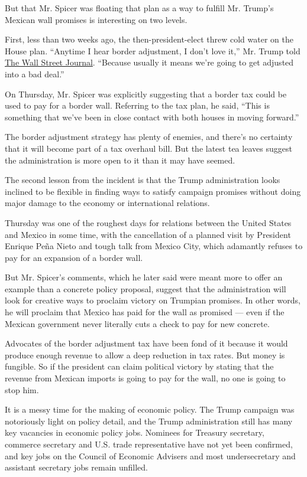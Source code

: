 But that Mr. Spicer was floating that plan as a way to fulfill Mr.
Trump's Mexican wall promises is interesting on two levels.

First, less than two weeks ago, the then-president-elect threw cold
water on the House plan. ``Anytime I hear border adjustment, I don't
love it,'' Mr. Trump told
\href{http://www.wsj.com/articles/trump-warns-on-house-republican-tax-plan-1484613766}{The
Wall Street Journal}. ``Because usually it means we're going to get
adjusted into a bad deal.''

On Thursday, Mr. Spicer was explicitly suggesting that a border tax
could be used to pay for a border wall. Referring to the tax plan, he
said, ``This is something that we've been in close contact with both
houses in moving forward.''

The border adjustment strategy has plenty of enemies, and there's no
certainty that it will become part of a tax overhaul bill. But the
latest tea leaves suggest the administration is more open to it than it
may have seemed.

The second lesson from the incident is that the Trump administration
looks inclined to be flexible in finding ways to satisfy campaign
promises without doing major damage to the economy or international
relations.

Thursday was one of the roughest days for relations between the United
States and Mexico in some time, with the cancellation of a planned visit
by President Enrique Peña Nieto and tough talk from Mexico City, which
adamantly refuses to pay for an expansion of a border wall.

But Mr. Spicer's comments, which he later said were meant more to offer
an example than a concrete policy proposal, suggest that the
administration will look for creative ways to proclaim victory on
Trumpian promises. In other words, he will proclaim that Mexico has paid
for the wall as promised --- even if the Mexican government never
literally cuts a check to pay for new concrete.

Advocates of the border adjustment tax have been fond of it because it
would produce enough revenue to allow a deep reduction in tax rates. But
money is fungible. So if the president can claim political victory by
stating that the revenue from Mexican imports is going to pay for the
wall, no one is going to stop him.

It is a messy time for the making of economic policy. The Trump campaign
was notoriously light on policy detail, and the Trump administration
still has many key vacancies in economic policy jobs. Nominees for
Treasury secretary, commerce secretary and U.S. trade representative
have not yet been confirmed, and key jobs on the Council of Economic
Advisers and most undersecretary and assistant secretary jobs remain
unfilled.

